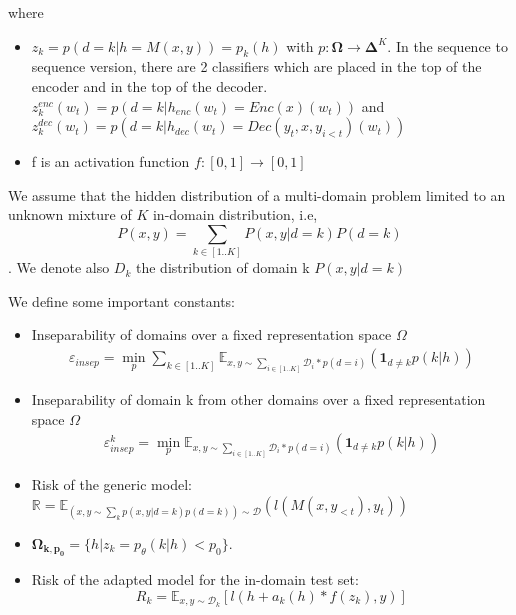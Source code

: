 \documentclass[12pt,a4paper,twoside]{report}
\theoremstyle{definition}
\newcommand{\fyTodo}[1]{\Todo[FY:]{\textcolor{orange}{#1}}}
\begin{document}
\noindent{}where
\begin{itemize}
\item $z_k = p(d=k | h=M(x,y)) = p_k(h)$ with $p: \mathbf{\Omega} \rightarrow \mathbf{\Delta}^{K}$. In the sequence to sequence version, there are 2 classifiers which are placed in the top of the encoder and in the top of the decoder.
$z^{enc}_k(w_t) = p(d=k| h_{enc}(w_t)=Enc(x)(w_t))$ and $z^{dec}_k(w_t) = p(d=k| h_{dec}(w_t)=Dec(y_t,x,y_{i<t})(w_t))$
\fyTodo{Attention à $x$ et $y$}
\item f is an activation function $f: [0,1] \rightarrow [0,1]$ 
\end{itemize}

We assume that the hidden distribution of a multi-domain problem limited to an unknown mixture of $K$ in-domain distribution, i.e, $$P(x,y) = \sum_{k\in[1..K]}P(x,y|d=k)P(d=k)$$. We denote also $D_k$ the distribution of domain k $P(x,y|d=k)$

We define some important constants:
\begin{itemize}
\item Inseparability of domains over a fixed representation space $\Omega$
\begin{equation}
  \begin{split}
  \mathbb{\varepsilon}_{insep} = \min_{p} \sum_{k\in[1..K]} \mathbb{E}_{x,y \sim \sum_{i\in [1..K]} \mathcal{D}_{i}*p(d=i)}(\mathbf{1}_{d\neq k} p(k|h))
  \end{split}
  \end{equation}
\item Inseparability of domain k from other domains over a fixed representation space $\Omega$
  \begin{equation}
  \begin{split}
  \mathbb{\varepsilon}_{insep}^k = \min_{p} \mathbb{E}_{x,y \sim \sum_{i\in [1..K]} \mathcal{D}_{i}*p(d=i)}(\mathbf{1}_{d\neq k} p(k|h))
  \end{split}
  \end{equation}
\item Risk of the generic model: $\mathbb{R} = \mathbb{E}_{(x,y \sim \sum_{k}p(x,y|d=k)p(d=k)) \sim \mathcal{D}}(l(M(x,y_{<t}), y_t))$ \fyTodo{wrt to which distribution ?}
\item $\mathbf{\Omega_{k,p_{0}}} = \lbrace h | z_k = p_\theta(k|h) < p_0\rbrace$.
\item Risk of the adapted model for the in-domain test set:
  $$R_k = \mathbb{E}_{x,y \sim \mathcal{D}_k} [l(h + a_k(h) * f(z_k), y)]$$
\end{itemize}
\end{document}
